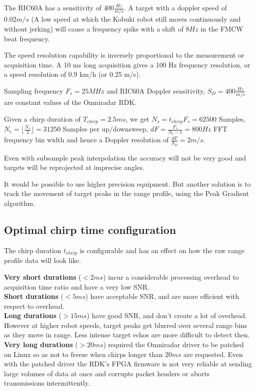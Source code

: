 The RIC60A has a sensitivity of \(400 \frac{Hz}{m/s}\). A target with a
doppler speed of \(0.02 m/s\) (A low speed at which the Kobuki robot
still moves continuously and without jerking) will cause a frequency
spike with a shift of \(8Hz\) in the FMCW beat frequency.

The speed resolution capability is inversely proportional to the
measurement or acquisition time. A 10 ms long acquisition gives a 100 Hz
frequency resolution, or a speed resolution of 0.9 km/h (or 0.25 m/s).

Sampling frequency \(F_s=25MHz\) and RIC60A Doppler sensitivity,
\(S_D = 400 \frac{Hz}{m/s}\) are constant values of the Omniradar RDK.

Given a chirp duration of \(T_{chirp} = 2.5ms\), we get
\(N_s = t_{chirp} F_s = 62500\) Samples,
\(N_r = \lfloor \frac{N_s}{2} \rfloor = 31250\) Samples per
up/downsweep, \(dF = \frac{F_s}{N_r - 1} = 800 Hz\) FFT frequency bin
width and hence a Doppler resolution of \(\frac{dF}{S_D} = 2 m/s\).

Even with subsample peak interpolation the accuracy will not be very
good and targets will be reprojected at imprecise angles.

It would be possible to use higher precision equipment. But another
solution is to track the movement of target peaks in the range profile,
using the Peak Gradient algorithm.

\subsection{Optimal chirp time configuration}\label{optimal-chirp-time-configuration}

The chirp duration \(t_{chirp}\) is configurable and has an effect on
how the raw range profile data will look like.

\textbf{Very short durations} (\(<2ms\)) incur a considerable processing
overhead to acquisition time ratio and have a very low SNR.\\
\textbf{Short durations} (\(<5ms\)) have acceptable SNR, and are more
efficient with respect to overhead.\\
\textbf{Long durations} (\(>15ms\))
have good SNR, and don't create a lot of overhead. However at higher
robot speeds, target peaks get blurred over several range bins as they
move in range. Less intense target echos are more difficult to detect
then.\\
\textbf{Very long durations} (\(>20ms\)) required the Omniradar
driver to be patched on Linux so as not to freeze when chirps longer
than \(20ms\) are requested. Even with the patched driver the RDK's FPGA
firmware is not very reliable at sending large volumes of data at once
and corrupts packet headers or aborts transmissions intermittently.

